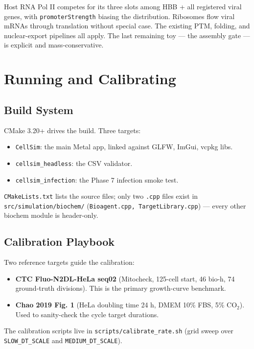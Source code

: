 \documentclass[11pt,letterpaper,twoside,openany]{book}
\newcommand{\code}[1]{\texttt{#1}}
\newcommand{\file}[1]{\texttt{\small#1}}
\begin{document}
Host RNA Pol II competes for its three slots among HBB + all
registered viral genes, with \code{promoterStrength} biasing the
distribution. Ribosomes flow viral mRNAs through translation
without special case. The existing PTM, folding, and nuclear-export
pipelines all apply. The last remaining toy --- the assembly
gate --- is explicit and mass-conservative.

\part{Running and Calibrating}

\chapter{Build System}
\label{ch:build}

CMake 3.20+ drives the build. Three targets:
\begin{itemize}
  \item \code{CellSim}: the main Metal app, linked against GLFW,
        ImGui, vcpkg libs.
  \item \code{cellsim\_headless}: the CSV validator.
  \item \code{cellsim\_infection}: the Phase 7 infection smoke test.
\end{itemize}
\file{CMakeLists.txt} lists the source files; only two \code{.cpp}
files exist in \file{src/simulation/biochem/}
(\code{Bioagent.cpp, TargetLibrary.cpp}) --- every other biochem
module is header-only.

\chapter{Calibration Playbook}
\label{ch:calibration}

Two reference targets guide the calibration:
\begin{itemize}
  \item \textbf{CTC Fluo-N2DL-HeLa seq02} (Mitocheck, 125-cell start,
        46 bio-h, 74 ground-truth divisions). This is the primary
        growth-curve benchmark.
  \item \textbf{Chao 2019 Fig. 1} (HeLa doubling time 24 h, DMEM
        10\% FBS, 5\% CO$_2$). Used to sanity-check the cycle
        target durations.
\end{itemize}
The calibration scripts live in \file{scripts/calibrate\_rate.sh}
(grid sweep over \code{SLOW\_DT\_SCALE} and \code{MEDIUM\_DT\_SCALE}).
\end{document}
